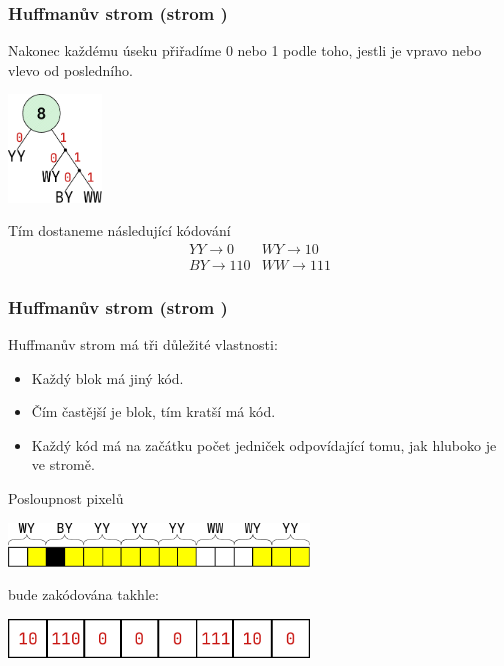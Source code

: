 \documentclass[aspectratio=169,11pt,svgnames,handout]{beamer}
\begin{document}
\begin{frame}
 \frametitle{Huffmanův strom (strom )}
 Nakonec každému úseku přiřadíme 0 nebo 1 podle toho, jestli je vpravo nebo
 vlevo od posledního.
 \begin{center}
  \vspace*{-1em}
  \includegraphics[width=2.5cm]{tree-5.pdf}
  \vspace*{-.5em}
 \end{center}
 \pause
 Tím dostaneme následující kódování
 \[
  \begin{array}{cc}
   YY \to 0 & WY \to 10\\
   BY \to 110 & WW \to 111
  \end{array}
 \]
\end{frame}

\begin{frame}
 \frametitle{Huffmanův strom (strom )}
 Huffmanův strom má tři důležité vlastnosti:
 \begin{itemize}[label=\textbullet]
  \item Každý blok má jiný kód.
  \item Čím častější je blok, tím kratší má kód.
  \item Každý kód má na začátku počet jedniček odpovídající tomu, jak hluboko je
   ve stromě.
 \end{itemize}
 \pause
 Posloupnost pixelů
 \begin{center}
  \vspace*{-.5em}
  \includegraphics[width=8cm]{image-7.pdf}
  \vspace*{-.5em}
 \end{center}
 \pause
 bude zakódována takhle:
 \begin{center}
  \includegraphics[width=8cm]{tree-6.pdf}
  \vspace*{-.5em}
 \end{center}
\end{frame}
\end{document}
